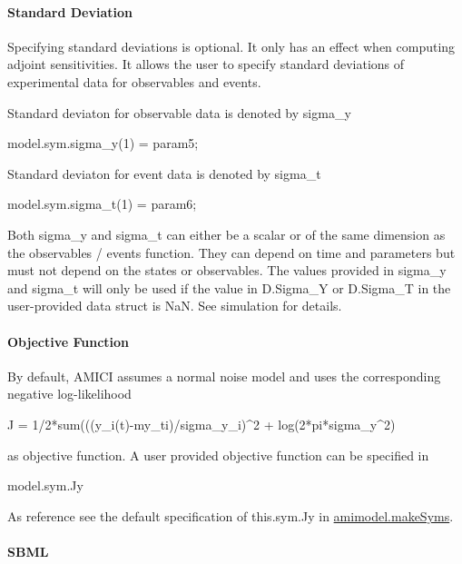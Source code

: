 \paragraph*{Standard Deviation}

Specifying standard deviations is optional. It only has an effect when computing adjoint sensitivities. It allows the user to specify standard deviations of experimental data for observables and events.

Standard deviaton for observable data is denoted by sigma\+\_\+y \begin{DoxyVerb}model.sym.sigma_y(1) = param5;
\end{DoxyVerb}


Standard deviaton for event data is denoted by sigma\+\_\+t \begin{DoxyVerb}model.sym.sigma_t(1) = param6;
\end{DoxyVerb}


Both {\ttfamily sigma\+\_\+y} and {\ttfamily sigma\+\_\+t} can either be a scalar or of the same dimension as the observables / events function. They can depend on time and parameters but must not depend on the states or observables. The values provided in {\ttfamily sigma\+\_\+y} and {\ttfamily sigma\+\_\+t} will only be used if the value in {\ttfamily D.\+Sigma\+\_\+Y} or {\ttfamily D.\+Sigma\+\_\+T} in the user-\/provided data struct is {\ttfamily NaN}. See simulation for details.

\paragraph*{Objective Function}

By default, A\+M\+I\+CI assumes a normal noise model and uses the corresponding negative log-\/likelihood \begin{DoxyVerb}J = 1/2*sum(((y_i(t)-my_ti)/sigma_y_i)^2 + log(2*pi*sigma_y^2)
\end{DoxyVerb}


as objective function. A user provided objective function can be specified in \begin{DoxyVerb}model.sym.Jy
\end{DoxyVerb}


As reference see the default specification of {\ttfamily this.\+sym.\+Jy} in {\ttfamily \mbox{\hyperlink{classamimodel_a5aba9155145df4b3f70bfec887c25af9}{amimodel.\+make\+Syms}}}.

\paragraph*{S\+B\+ML}

